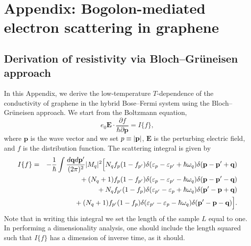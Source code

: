 \chapter{Appendix: Bogolon-mediated electron scattering in graphene}\label{AP:CH6}
% 
\section{Derivation of resistivity via Bloch--Gr\"uneisen approach }
In this Appendix, we derive the low-temperature $T$-dependence of the conductivity of graphene in the hybrid Bose--Fermi system using the Bloch--Gr\"uneisen approach.
%
We start from the Boltzmann equation,
%
\begin{equation}\label{AP6_A1}
e_0\textbf{E}\cdot\frac{\partial f}{\hbar\partial \textbf{p}}=I\{f\},
\end{equation}
%
where $\mathbf{p}$ is the wave vector and we set $p\equiv\abs{\mathbf{p}}$, $\mathbf{E}$ is the perturbing electric field, and $f$ is the distribution function.
%
The scattering integral is given by
%
\begin{eqnarray}
\label{AP6_A2}
I\{f\}&=&-\frac{1}{\hbar}\int\frac{d\textbf{q}d\textbf{p}'}{(2\pi)^2}|M_q|^2\Bigl[N_qf_p(1-f_{p'})\delta(\varepsilon_p-\varepsilon_{p'}+\hbar\omega_q)\delta(\textbf{p}-\textbf{p}'+\textbf{q})\nonumber\\
&{}&{}+(N_q+1)f_p(1-f_{p'})\delta(\varepsilon_p-\varepsilon_{p'}-\hbar\omega_q)\delta(\textbf{p}-\textbf{p}'-\textbf{q})\nonumber\\
&{}&{}+N_qf_{p'}(1-f_{p})\delta(\varepsilon_{p'}-\varepsilon_{p}+\hbar\omega_q)\delta(\textbf{p}'-\textbf{p}+\textbf{q})\nonumber\\
&{}&{}+(N_q+1)f_{p'}(1-f_p)\delta(\varepsilon_{p'}-\varepsilon_{p}-\hbar\omega_q)\delta(\textbf{p}'-\textbf{p}-\textbf{q})\Bigr].
\end{eqnarray}
%
Note that in writing this integral we set the length of the sample $L$ equal to one. In performing a dimensionality analysis, one should include the length squared such that $I\{f\}$ has a dimension of inverse time, as it should.


